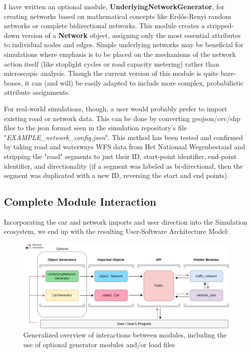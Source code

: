 \par I have written an optional module, \textbf{UnderlyingNetworkGenerator},  for creating networks based on mathematical concepts like Erdős-Renyi random networks or complete bidirectional networks.  This module creates a stripped-down version of a \textbf{Network} object, assigning only the most essential attributes to individual nodes and edges.  Simple underlying networks may be beneficial for simulations where emphasis is to be placed on the mechanisms of the network action itself (like stoplight cycles or road capacity metering) rather than microscopic analysis.  Though the current version of this module is quite bare-bones, it can (and will) be easily adapted to include more complex, probabilistic attribute assignments. \\

\par For real-world simulations, though, a user would probably prefer to import existing road or network data.  This can be done by converting geojson/csv/shp files to the json format seen in the simulation repository's file "\textit{EXAMPLE\_network\_config.json}".  This method has been tested and confirmed by taking road and waterways WFS data from Het Nationaal Wegenbestand \cite{NWB22} and stripping the "road" segments to just their ID, start-point identifier, end-point identifier, and directionality (if a segment was labeled as bi-directional, then the segment was duplicated with a new ID, reversing the start and end points).


\subsection{Complete Module Interaction}

\par Incorporating the car and network imports and user direction into the Simulation ecosystem, we end up with the resulting User-Software Architecture Model:

\begin{figure}[H]
    \centering
	\includegraphics[width=\textwidth]{tex files/Figures/complete_architecture.png}
	\caption[User-Software Interaction]{Generalized overview of interactions between modules, including the use of optional generator modules and/or load files}
	\label{fig:modules_all}
\end{figure}


